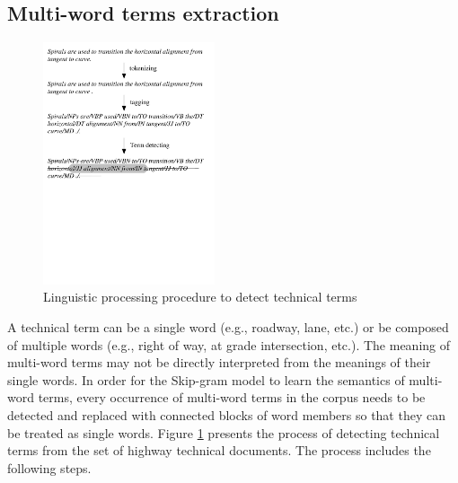\documentclass[Journal, BackFigs, DoubleSpace]{ascelike} %
\begin{document}
\subsection{Multi-word terms extraction}
%
\begin{figure}[t]
	\centering
	\includegraphics[width=0.45\textwidth]{Figure2_term_extraction}
	\caption{Linguistic processing procedure to detect technical terms}
	\label{fig:np_detect}
\end{figure}
%
A technical term can be a single word (e.g., roadway, lane, etc.) or be composed of multiple words (e.g., right of way, at grade intersection, etc.). The meaning of multi-word terms may not be directly interpreted from the meanings of their single words. In order for the Skip-gram model to learn the semantics of multi-word terms, every occurrence of multi-word terms in the corpus needs to be detected and replaced with connected blocks of word members so that they can be treated as single words. Figure \ref{fig:np_detect} presents the process of detecting technical terms from the set of highway technical documents. The process includes the following steps. 
\par
\end{document}
